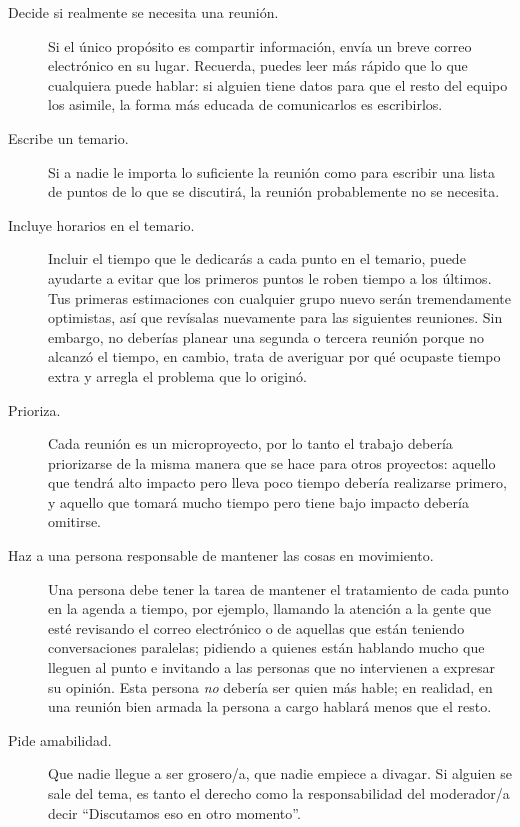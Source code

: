 \begin{description}

\item[Decide si realmente se necesita una reunión.]
  Si el único propósito es compartir información,
  envía un breve correo electrónico en su lugar.
  Recuerda,
  puedes leer más rápido que lo que cualquiera puede hablar:
  si alguien tiene datos para que el resto del equipo los asimile,
  la forma más educada de comunicarlos es escribirlos.

\item[Escribe un temario.]
  Si a nadie le importa lo suficiente la reunión como para escribir una lista de puntos
  de lo que se discutirá,
  la reunión probablemente no se necesita.

\item[Incluye horarios en el temario.]
  Incluir el tiempo que le dedicarás a cada punto en el temario,
  puede ayudarte a evitar que los primeros puntos le roben tiempo a los últimos.
  Tus primeras estimaciones con cualquier grupo nuevo serán tremendamente optimistas,
  así que revísalas nuevamente para las siguientes reuniones.
  Sin embargo,
  no deberías planear una segunda o tercera reunión
  porque no alcanzó el tiempo,
  en cambio,
  trata de averiguar por qué ocupaste tiempo extra y arregla el problema que lo originó. 

\item[Prioriza.]
  Cada reunión es un microproyecto,
  por lo tanto el trabajo debería priorizarse de la misma manera que se hace para otros proyectos:
  aquello que tendrá alto impacto pero lleva poco tiempo debería realizarse primero,
  y aquello que tomará mucho tiempo pero tiene bajo impacto debería omitirse.

\item[Haz a una persona responsable de mantener las cosas en movimiento.]
  Una persona debe tener la tarea de mantener el tratamiento 
  de cada punto en la agenda a tiempo, por ejemplo,
  llamando la atención a la gente que esté revisando el correo electrónico 
  o de aquellas que están teniendo conversaciones paralelas;
  pidiendo a quienes están hablando mucho que lleguen al punto
  e invitando a las personas que no intervienen a expresar su opinión.
  Esta persona \emph{no} debería ser quien más hable;
  en realidad, 
  en una reunión bien armada la persona a cargo hablará menos 
  que el resto.

\item[Pide amabilidad.]
  Que nadie llegue a ser grosero/a,
  que nadie empiece a divagar.
  Si alguien se sale del tema,
  es tanto el derecho como la responsabilidad del moderador/a decir
  ``Discutamos eso en otro momento''.


\end{description}
